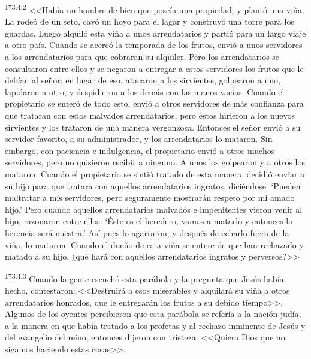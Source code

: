 \par 
\textsuperscript{173:4.2} <<Había un hombre de bien que poseía una propiedad, y plantó una viña. La rodeó de un seto, cavó un hoyo para el lagar y construyó una torre para los guardas. Luego alquiló esta viña a unos arrendatarios y partió para un largo viaje a otro país. Cuando se acercó la temporada de los frutos, envió a unos servidores a los arrendatarios para que cobraran su alquiler. Pero los arrendatarios se consultaron entre ellos y se negaron a entregar a estos servidores los frutos que le debían al señor; en lugar de eso, atacaron a los sirvientes, golpearon a uno, lapidaron a otro, y despidieron a los demás con las manos vacías. Cuando el propietario se enteró de todo esto, envió a otros servidores de más confianza para que trataran con estos malvados arrendatarios, pero éstos hirieron a los nuevos sirvientes y los trataron de una manera vergonzosa. Entonces el señor envió a su servidor favorito, a su administrador, y los arrendatarios lo mataron. Sin embargo, con paciencia e indulgencia, el propietario envió a otros muchos servidores, pero no quisieron recibir a ninguno. A unos los golpearon y a otros los mataron. Cuando el propietario se sintió tratado de esta manera, decidió enviar a su hijo para que tratara con aquellos arrendatarios ingratos, diciéndose: `Pueden maltratar a mis servidores, pero seguramente mostrarán respeto por mi amado hijo.' Pero cuando aquellos arrendatarios malvados e impenitentes vieron venir al hijo, razonaron entre ellos: `Éste es el heredero; vamos a matarlo y entonces la herencia será nuestra.' Así pues lo agarraron, y después de echarlo fuera de la viña, lo mataron. Cuando el dueño de esta viña se entere de que han rechazado y matado a su hijo, ¿qué hará con aquellos arrendatarios ingratos y perversos?>>

\par 
\textsuperscript{173:4.3} Cuando la gente escuchó esta parábola y la pregunta que Jesús había hecho, contestaron: <<Destruirá a esos miserables y alquilará su viña a otros arrendatarios honrados, que le entregarán los frutos a su debido tiempo>>. Algunos de los oyentes percibieron que esta parábola se refería a la nación judía, a la manera en que había tratado a los profetas y al rechazo inminente de Jesús y del evangelio del reino; entonces dijeron con tristeza: <<Quiera Dios que no sigamos haciendo estas cosas>>.

